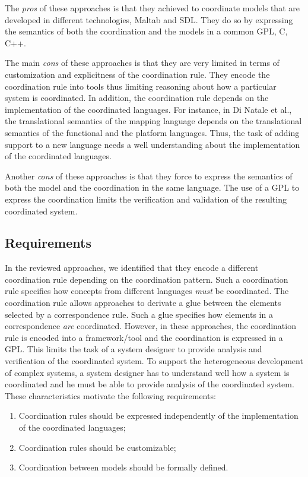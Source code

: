 The \emph{pros} of these approaches is that they achieved to coordinate models that are developed in different technologies, \ie Maltab and SDL. They do so by expressing the semantics of both the coordination and the models in a common GPL, \ie C, C++. 

The main \emph{cons} of these approaches is that they are very limited in terms of customization and explicitness of the coordination rule. They encode the coordination rule into tools thus limiting reasoning about how a particular system is coordinated. In addition, the coordination rule depends on the implementation of the coordinated languages. For instance, in Di Natale et al., the translational semantics of the mapping language depends on the translational semantics of the functional and the platform languages. Thus, the task of adding support to a new language needs a well understanding about the implementation of the coordinated languages.

Another \emph{cons} of these approaches is that they force to express the semantics of both the model and the coordination in the same language. The use of a GPL to express the coordination limits the verification and validation of the resulting coordinated system. 
	
\subsection{Requirements}
In the reviewed approaches, we identified that they encode a different coordination rule depending on the coordination pattern. Such a coordination rule specifies how concepts from different languages \emph{must} be coordinated. The coordination rule allows approaches to derivate a glue between the elements selected by a correspondence rule. Such a glue specifies how elements in a correspondence \emph{are} coordinated. However, in these approaches, the coordination rule is encoded into a framework/tool and the coordination is expressed in a GPL. This limits the task of a system designer to provide analysis and verification of the coordinated system. To support the heterogeneous development of complex systems, a system designer has to understand well how a system is coordinated and he must be able to provide analysis of the coordinated system. These characteristics motivate the following requirements:
	\begin{enumerate}
		\item Coordination rules should be expressed independently of the implementation of the coordinated languages;  
		\item Coordination rules should be customizable;
		\item Coordination between models should be formally defined. 
	\end{enumerate}
	
